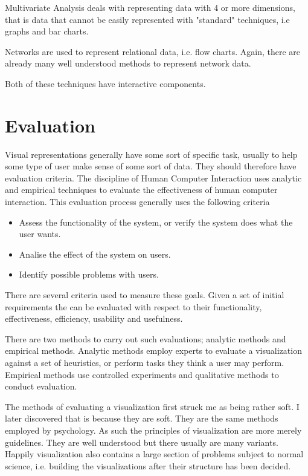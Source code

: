 \documentclass[a4paper, 10pt, titlepage]{article}
\begin{document}
Multivariate Analysis deals with representing data with 4 or more dimensions, that is data that cannot be easily represented with "standard" techniques, i.e graphs and bar charts.

Networks are used to represent relational data, i.e. flow charts. Again, there are already many well understood methods to represent network data.

Both of these techniques have interactive components.

\section{Evaluation}
Visual representations generally have some sort of specific task, usually to help some type of user make sense of some sort of data. They should therefore have evaluation criteria. The discipline of Human Computer Interaction uses analytic and empirical techniques to evaluate the effectiveness of human computer interaction. This evaluation process generally uses the following criteria \cite{dix2004human}
\begin{itemize}
\item Assess the functionality of the system, or verify the system does what the user wants.
\item Analise the effect of the system on users.
\item Identify possible problems with users.
\end{itemize}
There are several criteria used to measure these goals. Given a set of initial requirements the can be evaluated with respect to their functionality, effectiveness, efficiency, usability and usefulness.

There are two methods to carry out such evaluations; analytic methods and empirical methods. Analytic methods employ experts to evaluate a visualization against a set of heuristics, or perform tasks they think a user may perform. Empirical methods use controlled experiments and qualitative methods to conduct evaluation. 

The methods of evaluating a visualization first struck me as being rather soft. I later discovered that is because they are soft. They are the same methods employed by psychology. As such the principles of visualization are more merely guidelines. They are well understood but there usually are many variants. Happily visualization also contains a large section of problems subject to normal science, i.e. building the visualizations after their structure has been decided. 

\newpage


 


 
\end{document}
